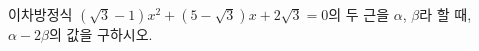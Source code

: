 이차방정식 $(\sqrt{3}-1)x^2+(5-\sqrt{3})x+2\sqrt{3}=0$의 두 근을 $\alpha$, $\beta$라 할 때, $\alpha-2\beta$의 값을 구하시오. \dmcondfill{$\alpha<\beta$}{}
